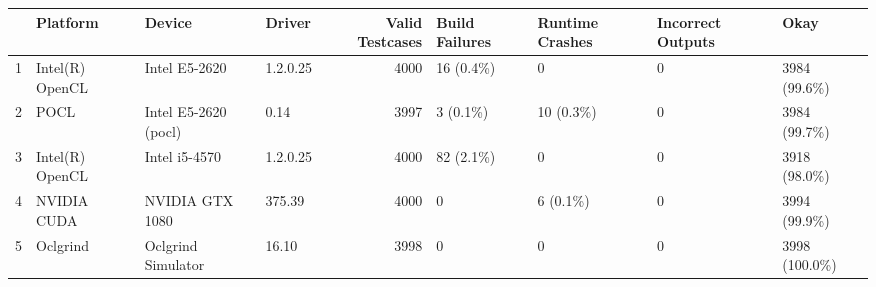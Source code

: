 \begin{tabular}{llllrllll}
\toprule
{} &         Platform &                Device &    Driver &  Valid Testcases & Build Failures & Runtime Crashes & Incorrect Outputs &           Okay \\
\midrule
1 &  Intel(R) OpenCL &         Intel E5-2620 &  1.2.0.25 &             4000 &      16 (0.4\%) &               0 &                 0 &   3984 (99.6\%) \\
2 &             POCL &  Intel E5-2620 (pocl) &      0.14 &             3997 &       3 (0.1\%) &       10 (0.3\%) &                 0 &   3984 (99.7\%) \\
3 &  Intel(R) OpenCL &         Intel i5-4570 &  1.2.0.25 &             4000 &      82 (2.1\%) &               0 &                 0 &   3918 (98.0\%) \\
4 &      NVIDIA CUDA &       NVIDIA GTX 1080 &    375.39 &             4000 &              0 &        6 (0.1\%) &                 0 &   3994 (99.9\%) \\
5 &         Oclgrind &    Oclgrind Simulator &     16.10 &             3998 &              0 &               0 &                 0 &  3998 (100.0\%) \\
\bottomrule
\end{tabular}
